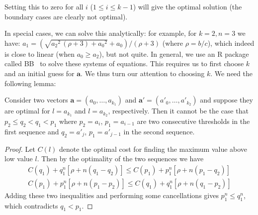 Setting this to zero for all $i$ ($1 \leq i \leq k-1$) will give the
optimal solution (the boundary cases are clearly not optimal).

In special cases, we can solve this analytically: for example, 
for $k =
2, n = 3$ we have: $a_1 =
(\sqrt{{a_2}^{2}\,(\rho+3)+{a_0}^{2}}+a_0)/(\rho+3)$ (where $\rho=b/c$), which
indeed is close to linear (when $a_0 \geq a_2$), but not quite.
In general, we use 
an R package called BB~\cite{Varadhan2009:BB} to
solve these systems of equations. 
This requires us to 
 first choose $k$ and an initial guess for $\boldsymbol a$.
We thus turn our attention to choosing $k$.  We need the following lemma:


\begin{lemma}\label{lemma:thresholds}
Consider two vectors $\boldsymbol a = (a_0, \ldots, a_{k_1})$ and
$\boldsymbol a' = (a'_0, \ldots, a'_{k_2})$ and suppose they are optimal
for $l=a_{k_1}$ and $l=a_{k_2}$, respectively.  Then it cannot be the case
that  $p_2 \leq q_2 < q_1 < p_1$
where $p_2 = a_i$, $p_1= a_{i-1}$ are two consecutive thresholds in the
first sequence and  $q_2 = a'_j$, $p_1= a'_{j-1}$ in the second sequence.
\end{lemma}

\begin{proof}
Let $C(l)$ denote the optimal cost for finding the maximum value above low
value $l$.
Then by the optimality of the two sequences we have
\begin{align*}
  C(q_1) + q_1^n [\rho+n(q_1-q_2)] \leq C(p_1) + p_1^n [\rho + n(p_1-q_2)]\\
  C(p_1) + p_1^n [\rho+n(p_1-p_2)] \leq C(q_1) + q_1^n [\rho + n(q_1-p_2)]
\end{align*}
Adding these two inequalities and performing some cancellations gives
$p_1^n \leq q_1^n$, which contradicts $q_1 < p_1$.
\end{proof}



